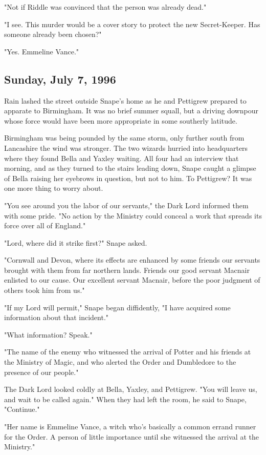 "Not if Riddle was convinced that the person was already dead."

"I see. This murder would be a cover story to protect the new Secret-Keeper. Has someone already been chosen?"

"Yes. Emmeline Vance."

\subsection{Sunday, July 7, 1996}

Rain lashed the street outside Snape's home as he and Pettigrew prepared to apparate to Birmingham. It was no brief summer squall, but a driving downpour whose force would have been more appropriate in some southerly latitude.

Birmingham was being pounded by the same storm, only further south from Lancashire the wind was stronger. The two wizards hurried into headquarters where they found Bella and Yaxley waiting. All four had an interview that morning, and as they turned to the stairs leading down, Snape caught a glimpse of Bella raising her eyebrows in question, but not to him. To Pettigrew? It was one more thing to worry about.

"You see around you the labor of our servants," the Dark Lord informed them with some pride. "No action by the Ministry could conceal a work that spreads its force over all of England."

"Lord, where did it strike first?" Snape asked.

"Cornwall and Devon, where its effects are enhanced by some friends our servants brought with them from far northern lands. Friends our good servant Macnair enlisted to our cause. Our excellent servant Macnair, before the poor judgment of others took him from us."

"If my Lord will permit," Snape began diffidently, "I have acquired some information about that{\el} incident."

"What information? Speak."

"The name of the enemy who witnessed the arrival of Potter and his friends at the Ministry of Magic, and who alerted the Order and Dumbledore to the presence of our people."

The Dark Lord looked coldly at Bella, Yaxley, and Pettigrew. "You will leave us, and wait to be called again." When they had left the room, he said to Snape, "Continue."

"Her name is Emmeline Vance, a witch who's basically a common errand runner for the Order. A person of little importance until she witnessed the arrival at the Ministry."

